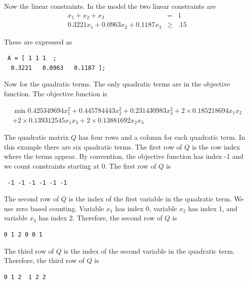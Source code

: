 \documentclass[11pt]{article}
\renewcommand{\_}{{\char"5F}}
\renewcommand{\{}{{\char"7B}}
\renewcommand{\}}{{\char"7D}}
\renewcommand{\^}{{\char"0D}}
\renewcommand{\'}{{\char"0D}}
\begin{document}
\begin{enumerate}[Step 1:]
 Now the linear constraints.   In the model the two linear constraints are
 \begin{eqnarray*}
 x_{1} + x_{2} + x_{3} &=& 1 \\
 0.3221 x_{1} +   0.0963x_{2} +    0.1187x_{3}  &\ge& .15
 \end{eqnarray*}



 These are expressed as



 \begin{verbatim}
 A = [ 1 1 1  ;
  0.3221   0.0963   0.1187 ];
 \end{verbatim}


Now for the quadratic terms. The only quadratic terms are in the objective function. The objective function is


\begin{eqnarray*}
\min  0.425349694 x_{1}^{2} +  0.445784443 x_{2}^{2} + 0.231430983 x_{3}^{2} + 2 \times 0.185218694 x_{1} x_{2} \\
+ 2 \times 0.139312545 x_{1} x_{3} + 2 \times 0.13881692 x_{2} x_{3}
\end{eqnarray*}


The quadratic matrix $Q$ has four rows and a column for each quadratic term. In this example there are six quadratic terms.  
The first row of $Q$ is the row index where the terms appear. By convention, the objective function has index -1 and we count constraints starting at 0.  The first row of $Q$ is


 \begin{verbatim}
 -1 -1 -1 -1 -1 -1
 \end{verbatim}

The second row of $Q$ is the index of the first variable in the quadratic term. We use zero based counting.  Variable $x_{1}$ has index 0, variable  $x_{2}$ has index 1, and variable $x_{3}$ has index 2.  Therefore, the second row of $Q$ is



\begin{verbatim}
0 1 2 0 0 1
\end{verbatim}



The third row of $Q$ is the index of the second variable in the quadratic term.   Therefore, the third row of $Q$ is



\begin{verbatim}
0 1 2  1 2 2
\end{verbatim}




\end{enumerate}
\end{document}
